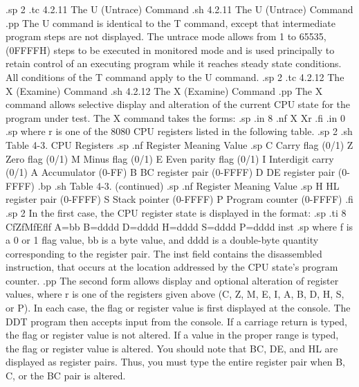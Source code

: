 .sp 2
.tc         4.2.11 The U (Untrace) Command
.sh
4.2.11  The U (Untrace) Command
.pp
The U command is identical to the T command, except that 
intermediate program steps are not displayed.  The untrace mode 
allows from 1 to 65535, (0FFFFH) steps to be executed in monitored 
mode and is used principally to retain control of an executing 
program while it reaches steady state conditions.  All conditions 
of the T command apply to the U command.
.sp 2
.tc         4.2.12 The X (Examine) Command
.sh
4.2.12  The X (Examine) Command
.pp
The X command allows selective display and alteration of the 
current CPU state for the program under test.  The X command 
takes the forms:
.sp
.in 8
.nf
X
Xr
.fi
.in 0
.sp
where r is one of the 8080 CPU registers listed in the following table.
.sp 2
.sh
                    Table 4-3.  CPU Registers
.sp
.nf
            Register        Meaning           Value
.sp
               C        Carry flag            (0/1)   
               Z        Zero flag             (0/1)
               M        Minus flag            (0/1)
               E        Even parity flag      (0/1)
               I        Interdigit carry      (0/1)
               A        Accumulator           (0-FF)
               B        BC register pair      (0-FFFF)
               D        DE register pair      (0-FFFF)
.bp   
.sh
                     Table 4-3.  (continued)
.sp
.nf
            Register        Meaning           Value
.sp
               H        HL register pair      (0-FFFF)
               S        Stack pointer         (0-FFFF)
               P        Program counter       (0-FFFF)
.fi
.sp 2
In the first case, the CPU register state is displayed in the 
format:
.sp
.ti 8
CfZfMfEflf A=bb B=dddd D=dddd H=dddd S=dddd P=dddd inst
.sp
where f is a 0 or 1 flag value, bb is a byte value, and dddd is a 
double-byte quantity corresponding to the register pair.  The 
inst field contains the disassembled instruction, that occurs at 
the location addressed by the CPU state's program counter.
.pp
The second form allows display and optional alteration of 
register values, where r is one of the registers given above (C, 
Z, M, E, I, A, B, D, H, S, or P).  In each case, the flag or 
register value is first displayed at the console.  The DDT 
program then accepts input from the console.  If a carriage 
return is typed, the flag or register value is not altered.  If 
a value in the proper range is typed, the flag or register value 
is altered.  You should note that BC, DE, and HL are 
displayed as register pairs.  Thus, you must type the entire 
register pair when B, C, or the BC pair is altered.
